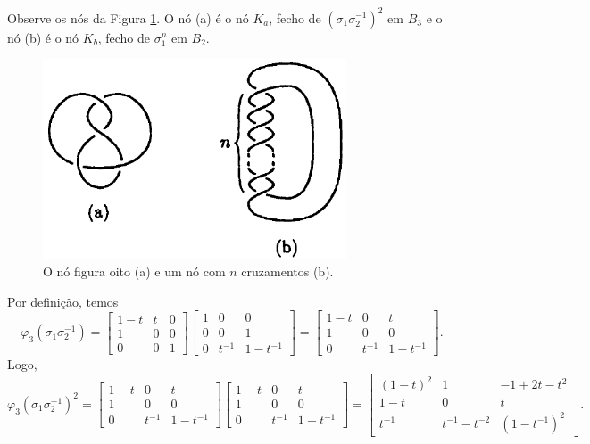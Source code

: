 	\par\vspace{0.3cm} Observe os nós da Figura \ref{nos exemplo polinomio Alexander}. 
	O nó (a) é o nó $K_a$, fecho de $(\sigma_1\sigma_2^{-1})^2$ em $B_3$ e o nó (b) é o nó $K_b$, 
	fecho de $\sigma_1^n$ em $B_2$.
	\begin{figure}[H]
		\begin{center}
			\includegraphics[width=9cm]{Images/no_de_oito_Alexander.png}
		\end{center}\caption{O nó figura oito (a) e um nó com $n$ cruzamentos (b).}\label{nos exemplo polinomio Alexander}
	\end{figure}
	Por definição, temos
	\begin{equation*}
    	\varphi_3(\sigma_1\sigma_2^{-1}) = \begin{bmatrix}
    	1-t & t & 0 \\
    	1 & 0 & 0 \\
    	0 & 0 & 1
    	\end{bmatrix}\begin{bmatrix}
    	1 & 0 & 0 \\
    	0 & 0 & 1 \\
    	0 & t^{-1} & 1-t^{-1}
    	\end{bmatrix} = \begin{bmatrix}
    	1-t & 0 & t \\
    	1 & 0 & 0 \\
    	0 & t^{-1} & 1-t^{-1}
    	\end{bmatrix}.
	\end{equation*}
	Logo,
	\begin{equation*}
    	\varphi_3(\sigma_1\sigma_2^{-1})^2 = \begin{bmatrix}
    	1-t & 0 & t \\
    	1 & 0 & 0 \\
    	0 & t^{-1} & 1-t^{-1}
    	\end{bmatrix}\begin{bmatrix}
    	1-t & 0 & t \\
    	1 & 0 & 0 \\
    	0 & t^{-1} & 1-t^{-1}
    	\end{bmatrix} = \begin{bmatrix}
    	(1-t)^2 & 1 & -1 +2t-t^2 \\
    	1-t & 0 & t \\
    	t^{-1} & t^{-1}-t^{-2} & (1-t^{-1})^2
    	\end{bmatrix}.
	\end{equation*}
